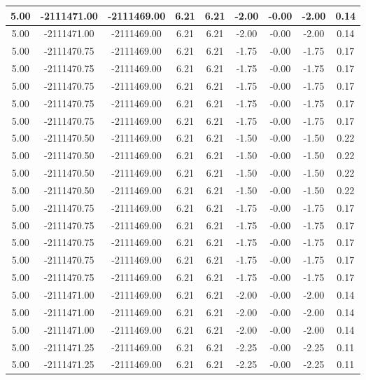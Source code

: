\begin{table}[htbp]
\begin{adjustbox}{angle=90}
\begin{tabular}{|c|c|c|c|c|c|c|c|c|}
 5.00 & -2111471.00 & -2111469.00 & 6.21 & 6.21 & -2.00 & -0.00 & -2.00 & 0.14\\ \hline
 5.00 & -2111471.00 & -2111469.00 & 6.21 & 6.21 & -2.00 & -0.00 & -2.00 & 0.14\\ \hline
 5.00 & -2111470.75 & -2111469.00 & 6.21 & 6.21 & -1.75 & -0.00 & -1.75 & 0.17\\ \hline
 5.00 & -2111470.75 & -2111469.00 & 6.21 & 6.21 & -1.75 & -0.00 & -1.75 & 0.17\\ \hline
 5.00 & -2111470.75 & -2111469.00 & 6.21 & 6.21 & -1.75 & -0.00 & -1.75 & 0.17\\ \hline
 5.00 & -2111470.75 & -2111469.00 & 6.21 & 6.21 & -1.75 & -0.00 & -1.75 & 0.17\\ \hline
 5.00 & -2111470.75 & -2111469.00 & 6.21 & 6.21 & -1.75 & -0.00 & -1.75 & 0.17\\ \hline
 5.00 & -2111470.50 & -2111469.00 & 6.21 & 6.21 & -1.50 & -0.00 & -1.50 & 0.22\\ \hline
 5.00 & -2111470.50 & -2111469.00 & 6.21 & 6.21 & -1.50 & -0.00 & -1.50 & 0.22\\ \hline
 5.00 & -2111470.50 & -2111469.00 & 6.21 & 6.21 & -1.50 & -0.00 & -1.50 & 0.22\\ \hline
 5.00 & -2111470.50 & -2111469.00 & 6.21 & 6.21 & -1.50 & -0.00 & -1.50 & 0.22\\ \hline
 5.00 & -2111470.75 & -2111469.00 & 6.21 & 6.21 & -1.75 & -0.00 & -1.75 & 0.17\\ \hline
 5.00 & -2111470.75 & -2111469.00 & 6.21 & 6.21 & -1.75 & -0.00 & -1.75 & 0.17\\ \hline
 5.00 & -2111470.75 & -2111469.00 & 6.21 & 6.21 & -1.75 & -0.00 & -1.75 & 0.17\\ \hline
 5.00 & -2111470.75 & -2111469.00 & 6.21 & 6.21 & -1.75 & -0.00 & -1.75 & 0.17\\ \hline
 5.00 & -2111470.75 & -2111469.00 & 6.21 & 6.21 & -1.75 & -0.00 & -1.75 & 0.17\\ \hline
 5.00 & -2111471.00 & -2111469.00 & 6.21 & 6.21 & -2.00 & -0.00 & -2.00 & 0.14\\ \hline
 5.00 & -2111471.00 & -2111469.00 & 6.21 & 6.21 & -2.00 & -0.00 & -2.00 & 0.14\\ \hline
 5.00 & -2111471.00 & -2111469.00 & 6.21 & 6.21 & -2.00 & -0.00 & -2.00 & 0.14\\ \hline
 5.00 & -2111471.25 & -2111469.00 & 6.21 & 6.21 & -2.25 & -0.00 & -2.25 & 0.11\\ \hline
 5.00 & -2111471.25 & -2111469.00 & 6.21 & 6.21 & -2.25 & -0.00 & -2.25 & 0.11\\ \hline

\end{tabular}
\end{adjustbox}
\end{table}
